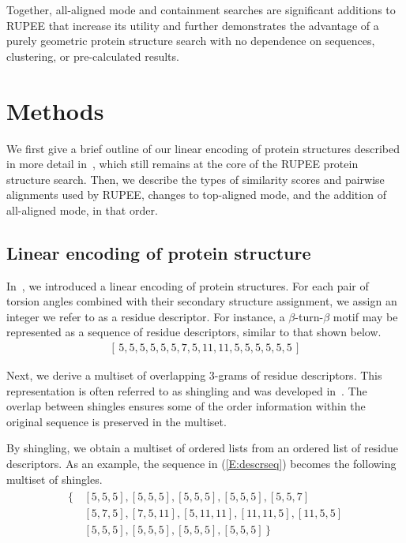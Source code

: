 \documentclass[10pt,letterpaper]{article}
\begin{document}
Together, all-aligned mode and containment searches are significant additions to RUPEE that increase its utility and further demonstrates the advantage of a purely geometric protein structure search with no dependence on sequences, clustering, or pre-calculated results.

\section*{Methods}

We first give a brief outline of our linear encoding of protein structures described in more detail in~\cite{Ayoub2019}, which still remains at the core of the RUPEE protein structure search. 
Then, we describe the types of similarity scores and pairwise alignments used by RUPEE, changes to top-aligned mode, and the addition of all-aligned mode, in that order.

\subsection*{Linear encoding of protein structure}

In~\cite{Ayoub2019}, we introduced a linear encoding of protein structures.
For each pair of torsion angles combined with their secondary structure assignment, we assign an integer we refer to as a residue descriptor.
For instance, a $\beta$-turn-$\beta$ motif may be represented as a sequence of residue descriptors, similar to that shown below. 
\begin{gather}\label{E:descrseq} 
    [\, 5, 5, 5, 5, 5, 5, 7, 5, 11, 11, 5, 5, 5, 5, 5, 5 \,]
\end{gather}

Next, we derive a multiset of overlapping 3-grams of residue descriptors. 
This representation is often referred to as shingling and was developed in~\cite{Broder1997a}. 
The overlap between shingles ensures some of the order information within the original sequence is preserved in the multiset. 

By shingling, we obtain a multiset of ordered lists from an ordered list of residue descriptors. 
As an example, the sequence in (\ref{E:descrseq}) becomes the following multiset of shingles. 
\begin{align}\label{E:shinglebag}
    \begin{split}
        \{\,&[5, 5, 5], [5, 5, 5], [5, 5, 5], [5, 5, 5], [5, 5, 7] \\
            & [5, 7, 5], [7, 5, 11], [5, 11, 11], [11, 11, 5], [11, 5, 5] \\
            & [5, 5, 5], [5, 5, 5], [5, 5, 5], [5, 5, 5] \,\}
    \end{split}
\end{align}
\end{document}
